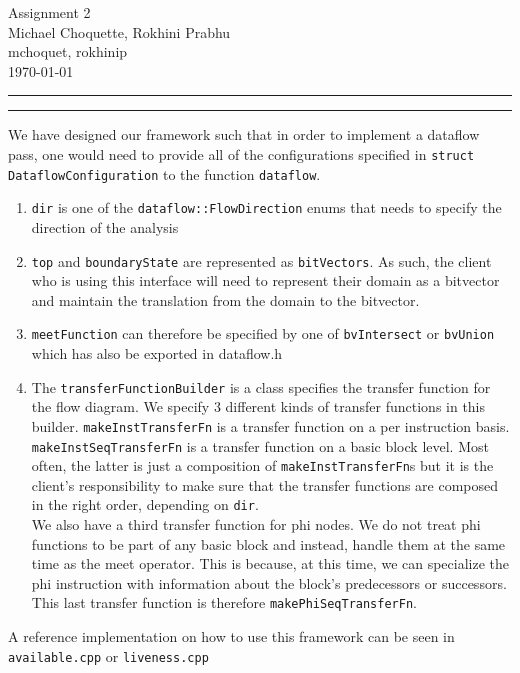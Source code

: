 \documentclass[11pt]{article}
\newcounter{questionCounter}
\newcounter{partCounter}[questionCounter]
\newenvironment{question}[2][\arabic{questionCounter}]{%
    \setcounter{partCounter}{0}%
    \vspace{.25in} \hrule \vspace{0.5em}%
        \noindent{\bf #2}%
    \vspace{0.8em} \hrule \vspace{.10in}%
    \addtocounter{questionCounter}{1}%
}{}
\newcommand{\myname}{Michael Choquette, Rokhini Prabhu}
\newcommand{\myandrew}{mchoquet, rokhinip}
\newcommand{\myhwname}{Assignment 2}
\begin{document}
\thispagestyle{plain}

\begin{center}
{\Large \myhwname} \\
\myname \\
\myandrew \\
\today
\end{center}

\newcommand{\code}[1]{\texttt{#1}}
\begin{question}{Writeup}
We have designed our framework such that in order to implement a dataflow pass,
one would need to provide all of the configurations specified in \texttt{struct
DataflowConfiguration} to the function \texttt{dataflow}.
\begin{enumerate}
\item \texttt{dir} is one of the \texttt{dataflow::FlowDirection} enums that
needs to specify the direction of the analysis
\item \texttt{top} and \texttt{boundaryState} are represented as
\texttt{bitVectors}. As such, the client who is using this interface will need 
to represent their domain as a bitvector and maintain the translation from the 
domain to the bitvector.
\item \texttt{meetFunction} can therefore be specified by one of
\texttt{bvIntersect} or \texttt{bvUnion} which has also be exported in
dataflow.h
\item The \texttt{transferFunctionBuilder} is a class specifies the transfer
function for the flow diagram. We specify 3 different kinds of transfer
functions in this builder. \texttt{makeInstTransferFn} is a transfer function on
a per instruction basis. \texttt{makeInstSeqTransferFn} is a transfer function
on a basic block level. Most often, the latter is just a composition of
\texttt{makeInstTransferFn}s but it is the client's responsibility to make sure
that the transfer functions are composed in the right order, depending on
\texttt{dir}. \\
We also have a third transfer function for phi nodes.
We do not treat phi functions to be part of any basic block and
instead, handle them at the same time as the meet operator. This is because, at
this time, we can specialize the phi instruction with information about the
block's predecessors or successors. This last transfer function is therefore 
\texttt{makePhiSeqTransferFn}.
\end{enumerate}

A reference implementation on how to use this framework can be seen in
\texttt{available.cpp} or \texttt{liveness.cpp}

\end{question}
\end{document}
